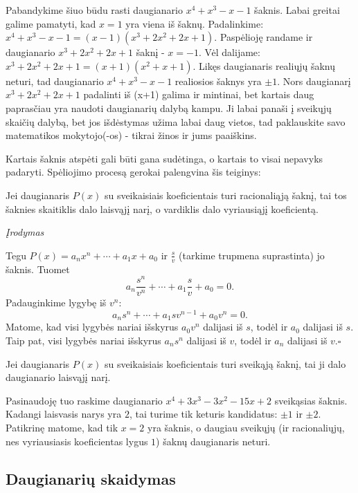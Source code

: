 Pabandykime šiuo būdu rasti daugianario $x^4 + x^3 - x - 1$ šaknis. Labai
greitai galime pamatyti, kad $x=1$ yra viena iš šaknų. Padalinkime: $x^4 +
x^3 - x - 1 = (x-1)(x^3 + 2x^2 + 2x + 1)$. Paspėlioję randame ir
daugianario $x^3 + 2x^2 + 2x + 1$ šaknį - $x=-1$. Vėl dalijame: $x^3 + 2x^2
+ 2x + 1 = (x+1)(x^2+x+1)$. Likęs daugianaris realiųjų šaknų neturi, tad
daugianario $x^4 + x^3 - x - 1$ realiosios šaknys yra $\pm 1$. Nors
daugianarį $x^3 + 2x^2 + 2x + 1$ padalinti iš (x+1) galima ir mintinai, bet
kartais daug paprasčiau yra naudoti daugianarių dalybą kampu. Ji labai
panaši į sveikųjų skaičių dalybą, bet jos išdėstymas užima labai daug
vietos, tad paklauskite savo matematikos mokytojo(-os) - tikrai žinos ir
jums paaiškins. 

\bigskip

Kartais šaknis atspėti gali būti gana sudėtinga, o kartais to visai
nepavyks padaryti. Spėliojimo procesą gerokai palengvina šis teiginys:

\begin{teig}
Jei daugianaris $P(x)$ su sveikaisiais koeficientais turi racionaliąją
šaknį, tai tos šaknies skaitiklis dalo laisvąjį narį, o vardiklis dalo
vyriausiąjį koeficientą. 
\end{teig}  

\emph{Įrodymas}

Tegu $P(x) = a_nx^n + \cdots +a_1x + a_0$ ir $\frac{s}{v}$ (tarkime
trupmena suprastinta) jo šaknis. Tuomet $$a_n\frac{s^n}{v^n} + \cdots +
a_1\frac{s}{v} + a_0 = 0.$$ Padauginkime lygybę iš $v^n$: $$a_n{s^n} +
\cdots + a_1sv^{n-1} + a_0v^n = 0.$$ Matome, kad visi lygybės nariai
išskyrus $a_0v^n$ dalijasi iš $s$, todėl ir $a_0$ dalijasi iš $s$. Taip
pat, visi lygybės nariai išskyrus $a_n{s^n}$ dalijasi iš $v$, todėl ir
$a_n$ dalijasi iš $v$.$\square$

\begin{isv}
Jei daugianaris $P(x)$ su sveikaisiais koeficientais turi sveikąją šaknį,
tai ji dalo daugianario laisvąjį narį.
\end{isv} 

Pasinaudoję tuo raskime daugianario $x^4 + 3x^3 - 3x^2 -15x + 2$ sveikąsias
šaknis. Kadangi laisvasis narys yra $2$, tai turime tik keturis kandidatus:
$\pm 1$ ir $\pm 2$. Patikrinę matome, kad tik $x=2$ yra šaknis, o daugiau
sveikųjų (ir racionaliųjų, nes vyriausiasis koeficientas lygus $1$) šaknų
daugianaris neturi.

\subsection{Daugianarių skaidymas}

